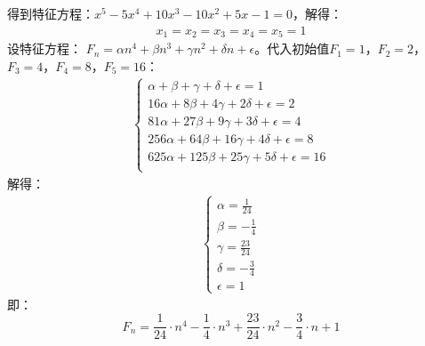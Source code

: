\begin{solution}
    得到特征方程：$x^5-5x^4+10x^3-10x^2+5x-1=0$，解得：
    \begin{align*}
        x_1 = x_2 = x_3 = x_4 = x_5 = 1
    \end{align*}
    设特征方程：
    $F_n = \alpha n^4+\beta n^3 +\gamma n^2 + \delta n +\epsilon$。代入初始值$F_1=1$，$F_2=2$，$F_3=4$，$F_4=8$，$F_5=16$：
    \begin{align*}
        \begin{cases}
            \alpha + \beta + \gamma + \delta +\epsilon= 1\\
            16\alpha + 8\beta + 4\gamma + 2\delta +\epsilon= 2\\
            81\alpha + 27\beta + 9\gamma + 3\delta +\epsilon= 4\\
            256\alpha + 64\beta + 16\gamma + 4\delta +\epsilon= 8\\
            625\alpha + 125\beta + 25\gamma + 5\delta +\epsilon= 16\\
        \end{cases}
    \end{align*}
    解得：
    \begin{align*}
        \begin{cases}
            \alpha = \frac{1}{24}\\
            \beta = -\frac{1}{4}\\
            \gamma = \frac{23}{24}\\
            \delta = -\frac{3}{4}\\
            \epsilon = 1
        \end{cases}
    \end{align*}
    即：
    $$F_n = \frac{1}{24}\cdot n^4 - \frac{1}{4}\cdot n^3 + \frac{23}{24}\cdot n^2 - \frac{3}{4}\cdot n + 1$$
\end{solution}